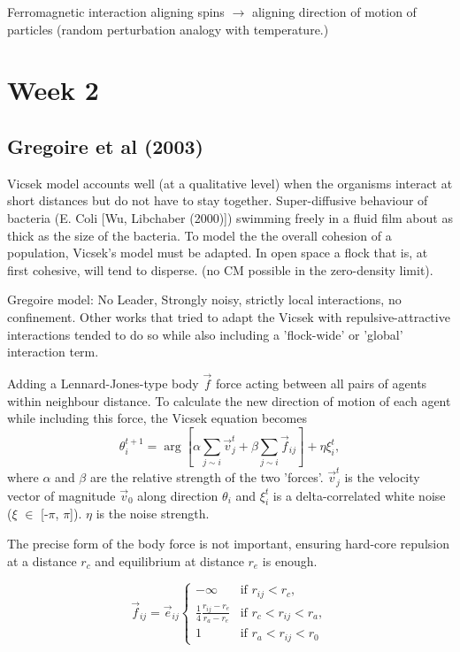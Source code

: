 \documentclass[10pt,twocolumn]{revtex4-2}    %
\begin{document}
Ferromagnetic interaction aligning spins $\rightarrow$ aligning direction of motion of particles (random perturbation analogy with temperature.)


\section{Week 2}

\subsection{Gregoire et al (2003)}

Vicsek model accounts well (at a qualitative level) when the organisms interact at short distances but do not have to stay together. Super-diffusive behaviour of bacteria (E. Coli [Wu, Libchaber (2000)]) swimming freely in a fluid film about as thick as the size of the bacteria. To model the the overall cohesion of a population, Vicsek's model must be adapted. In open space a flock that is, at first cohesive, will tend to disperse. (no CM possible in the zero-density limit). 

Gregoire model:
No Leader, Strongly  noisy, strictly local interactions, no confinement.
Other works that tried to adapt the Vicsek with repulsive-attractive interactions tended to do so while also including a 'flock-wide' or 'global' interaction term.

Adding a Lennard-Jones-type body $\vec{f}$ force acting between all pairs of agents within neighbour distance. To calculate the new direction of motion of each agent while including this force, the Vicsek equation becomes
\begin{equation}
    \theta_i^{t+1} = \arg \left[ \alpha \sum_{j \sim i} \vec{v}_j^t + \beta \sum_{j \sim i} \vec{f}_{ij} \right] + \eta \xi_i^t,
    \label{eq:sample_equation}
\end{equation}
where $\alpha$ and $\beta$ are the relative strength of the two 'forces'. $\vec{v}_j^t$ is the velocity vector of magnitude $\vec{v}_0$ along direction $\theta_i$ and $\xi_i^t$ is a delta-correlated white noise ($\xi$ $\in$ [-$\pi$, $\pi$]). $\eta$ is the noise strength. 

The precise form of the body force is not important, ensuring hard-core repulsion at a distance $r_c$ and equilibrium at distance $r_e$ is enough.

\begin{equation}
    \vec{f}_{ij} = \vec{e}_{ij} 
    \begin{cases} 
        -\infty & \text{if } r_{ij} < r_c, \\
        \frac{1}{4} \frac{r_{ij} - r_e}{r_a - r_e} & \text{if } r_c < r_{ij} < r_a, \\
        1 & \text{if } r_a < r_{ij} < r_0
    \end{cases}
\end{equation}
\end{document}
